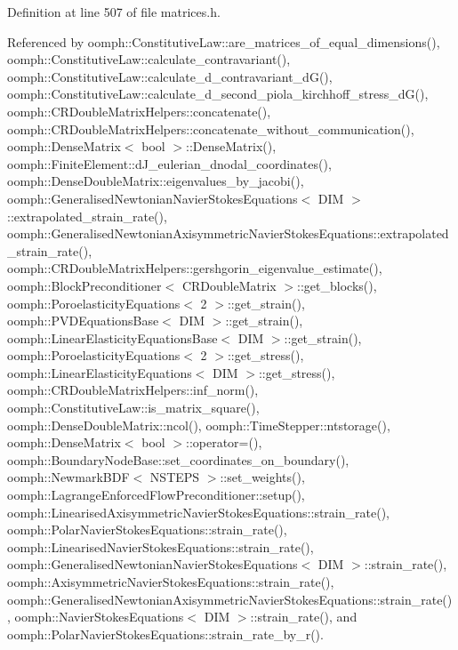 Definition at line 507 of file matrices.\+h.



Referenced by oomph\+::\+Constitutive\+Law\+::are\+\_\+matrices\+\_\+of\+\_\+equal\+\_\+dimensions(), oomph\+::\+Constitutive\+Law\+::calculate\+\_\+contravariant(), oomph\+::\+Constitutive\+Law\+::calculate\+\_\+d\+\_\+contravariant\+\_\+d\+G(), oomph\+::\+Constitutive\+Law\+::calculate\+\_\+d\+\_\+second\+\_\+piola\+\_\+kirchhoff\+\_\+stress\+\_\+d\+G(), oomph\+::\+C\+R\+Double\+Matrix\+Helpers\+::concatenate(), oomph\+::\+C\+R\+Double\+Matrix\+Helpers\+::concatenate\+\_\+without\+\_\+communication(), oomph\+::\+Dense\+Matrix$<$ bool $>$\+::\+Dense\+Matrix(), oomph\+::\+Finite\+Element\+::d\+J\+\_\+eulerian\+\_\+dnodal\+\_\+coordinates(), oomph\+::\+Dense\+Double\+Matrix\+::eigenvalues\+\_\+by\+\_\+jacobi(), oomph\+::\+Generalised\+Newtonian\+Navier\+Stokes\+Equations$<$ D\+I\+M $>$\+::extrapolated\+\_\+strain\+\_\+rate(), oomph\+::\+Generalised\+Newtonian\+Axisymmetric\+Navier\+Stokes\+Equations\+::extrapolated\+\_\+strain\+\_\+rate(), oomph\+::\+C\+R\+Double\+Matrix\+Helpers\+::gershgorin\+\_\+eigenvalue\+\_\+estimate(), oomph\+::\+Block\+Preconditioner$<$ C\+R\+Double\+Matrix $>$\+::get\+\_\+blocks(), oomph\+::\+Poroelasticity\+Equations$<$ 2 $>$\+::get\+\_\+strain(), oomph\+::\+P\+V\+D\+Equations\+Base$<$ D\+I\+M $>$\+::get\+\_\+strain(), oomph\+::\+Linear\+Elasticity\+Equations\+Base$<$ D\+I\+M $>$\+::get\+\_\+strain(), oomph\+::\+Poroelasticity\+Equations$<$ 2 $>$\+::get\+\_\+stress(), oomph\+::\+Linear\+Elasticity\+Equations$<$ D\+I\+M $>$\+::get\+\_\+stress(), oomph\+::\+C\+R\+Double\+Matrix\+Helpers\+::inf\+\_\+norm(), oomph\+::\+Constitutive\+Law\+::is\+\_\+matrix\+\_\+square(), oomph\+::\+Dense\+Double\+Matrix\+::ncol(), oomph\+::\+Time\+Stepper\+::ntstorage(), oomph\+::\+Dense\+Matrix$<$ bool $>$\+::operator=(), oomph\+::\+Boundary\+Node\+Base\+::set\+\_\+coordinates\+\_\+on\+\_\+boundary(), oomph\+::\+Newmark\+B\+D\+F$<$ N\+S\+T\+E\+P\+S $>$\+::set\+\_\+weights(), oomph\+::\+Lagrange\+Enforced\+Flow\+Preconditioner\+::setup(), oomph\+::\+Linearised\+Axisymmetric\+Navier\+Stokes\+Equations\+::strain\+\_\+rate(), oomph\+::\+Polar\+Navier\+Stokes\+Equations\+::strain\+\_\+rate(), oomph\+::\+Linearised\+Navier\+Stokes\+Equations\+::strain\+\_\+rate(), oomph\+::\+Generalised\+Newtonian\+Navier\+Stokes\+Equations$<$ D\+I\+M $>$\+::strain\+\_\+rate(), oomph\+::\+Axisymmetric\+Navier\+Stokes\+Equations\+::strain\+\_\+rate(), oomph\+::\+Generalised\+Newtonian\+Axisymmetric\+Navier\+Stokes\+Equations\+::strain\+\_\+rate(), oomph\+::\+Navier\+Stokes\+Equations$<$ D\+I\+M $>$\+::strain\+\_\+rate(), and oomph\+::\+Polar\+Navier\+Stokes\+Equations\+::strain\+\_\+rate\+\_\+by\+\_\+r().

